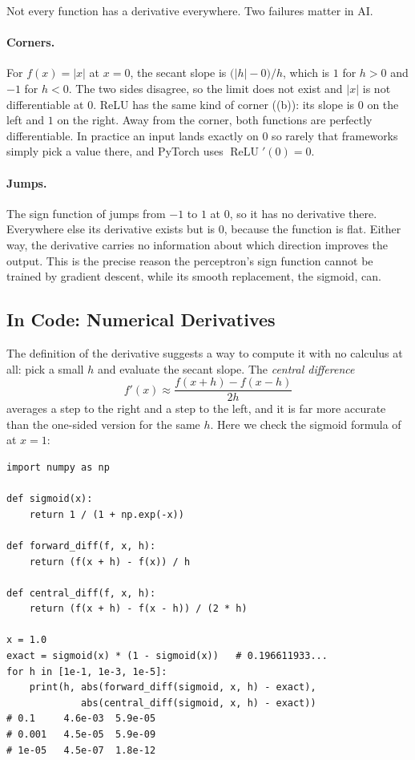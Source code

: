 Not every function has a derivative everywhere. Two failures matter in AI.

\paragraph{Corners.}
For $f(x) = |x|$ at $x = 0$, the secant slope is
$\bigl(|h| - 0\bigr)/h$, which is $1$ for $h > 0$ and $-1$ for $h < 0$. The
two sides disagree, so the limit does not exist and $|x|$ is not
differentiable at $0$. ReLU has the same kind of corner
((b)): its slope is $0$ on the left
and $1$ on the right. Away from the corner, both functions are perfectly
differentiable. In practice an input lands exactly on $0$ so rarely that
frameworks simply pick a value there, and PyTorch uses
$\operatorname{ReLU}'(0) = 0$.

\paragraph{Jumps.}
The sign function of  jumps from $-1$ to $1$
at $0$, so it has no derivative there. Everywhere else its derivative
exists but is $0$, because the function is flat. Either way, the derivative
carries no information about which direction improves the output. This is
the precise reason the perceptron's sign function cannot be trained by
gradient descent, while its smooth replacement, the sigmoid, can.

\subsection{In Code: Numerical Derivatives}
\label{sec:ch02-numerical}

The definition of the derivative suggests a way to compute it with no
calculus at all: pick a small $h$ and evaluate the secant slope. The
\emph{central difference}
\[
  f'(x) \approx \frac{f(x + h) - f(x - h)}{2h}
\]
averages a step to the right and a step to the left, and it is far more
accurate than the one-sided version for the same $h$. Here we check the
sigmoid formula of  at $x = 1$:

\begin{lstlisting}
import numpy as np

def sigmoid(x):
    return 1 / (1 + np.exp(-x))

def forward_diff(f, x, h):
    return (f(x + h) - f(x)) / h

def central_diff(f, x, h):
    return (f(x + h) - f(x - h)) / (2 * h)

x = 1.0
exact = sigmoid(x) * (1 - sigmoid(x))   # 0.196611933...
for h in [1e-1, 1e-3, 1e-5]:
    print(h, abs(forward_diff(sigmoid, x, h) - exact),
             abs(central_diff(sigmoid, x, h) - exact))
# 0.1     4.6e-03  5.9e-05
# 0.001   4.5e-05  5.9e-09
# 1e-05   4.5e-07  1.8e-12
\end{lstlisting}

